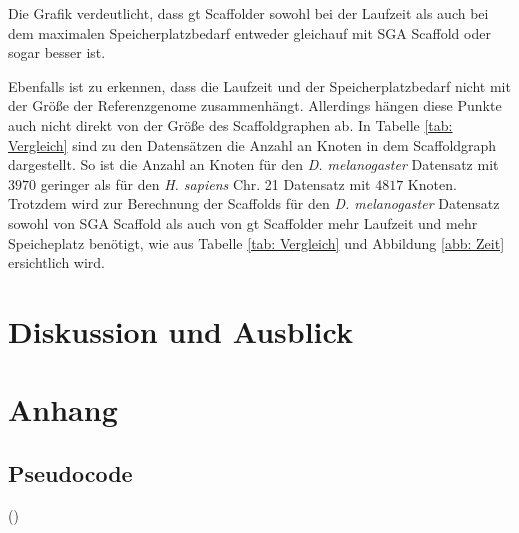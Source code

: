 \documentclass[a4paper,10pt,parskip]{scrartcl}
\begin{document}
Die Grafik verdeutlicht, dass gt Scaffolder sowohl bei der Laufzeit
als auch bei dem maximalen Speicherplatzbedarf entweder gleichauf mit
SGA Scaffold oder sogar besser ist.

Ebenfalls ist zu erkennen, dass die Laufzeit und der
Speicherplatzbedarf nicht mit der Größe der Referenzgenome
zusammenhängt. Allerdings hängen diese Punkte  auch nicht direkt von der Größe des Scaffoldgraphen
ab. In Tabelle \ref{tab: Vergleich} sind zu den Datensätzen die Anzahl
an Knoten in dem Scaffoldgraph dargestellt. So ist die Anzahl an
Knoten für den \textit{D. melanogaster} Datensatz mit $3970$ geringer
als für den \textit{H. sapiens} Chr. 21 Datensatz mit $4817$
Knoten. Trotzdem wird zur Berechnung der Scaffolds für den
\textit{D. melanogaster} Datensatz sowohl von SGA Scaffold als auch
von gt Scaffolder mehr Laufzeit und mehr Speicheplatz benötigt, wie
aus Tabelle \ref{tab: Vergleich} und Abbildung \ref{abb: Zeit}
ersichtlich wird. 


\section{Diskussion und Ausblick}

\section*{Anhang}
\subsection*{Pseudocode}
()
\end{document}
